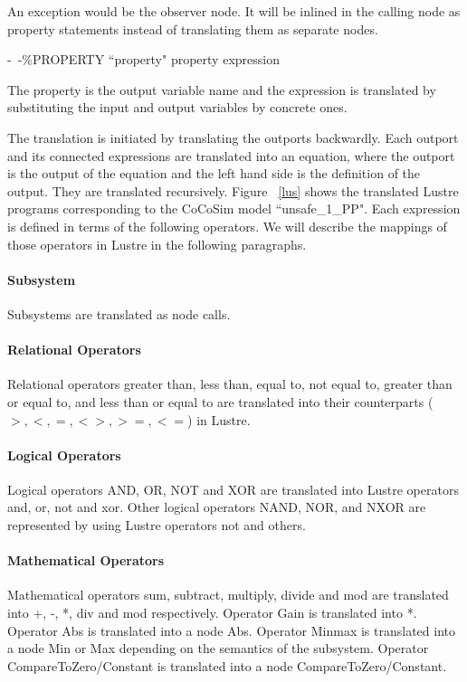 \documentclass{article}
\begin{document}
An exception would be the observer node.
It will be inlined in the calling node as property statements instead of translating them 
as separate nodes.

\*

\indent \indent \indent \indent \textsf{-\ -\%PROPERTY ``property" property expression}

\*


\noindent The \textsf{property} is the output variable name and the expression is translated 
by substituting the input and output variables by concrete ones.

The translation is initiated by translating the outports backwardly. 
Each outport and its connected expressions are translated into an equation, where the outport is the output of the equation 
and the left hand side is the definition of the output.
They are translated recursively.
Figure ~\ref{lus} shows the translated Lustre programs corresponding to the CoCoSim model ``unsafe\_1\_PP".
Each expression is defined in terms of the following operators. 
We will describe the mappings of those operators in Lustre in the following paragraphs.

\paragraph{Subsystem} 
Subsystems are translated as node calls. 


\paragraph{Relational Operators} 
Relational operators greater than, less than, equal to, not equal to, greater 
than or equal to, and less than or equal to are translated into their counterparts 
($>, <, =, <>, >=, <=$) in Lustre.


\paragraph{Logical Operators} 
Logical operators AND, OR, NOT and XOR are translated into Lustre operators 
\textsf{and, or, not} and \textsf{xor}.
Other logical operators NAND, NOR, and NXOR are represented by using Lustre 
operators \textsf{not} and others.

\paragraph{Mathematical Operators} 
Mathematical operators sum, subtract, multiply, divide and mod are translated into 
\textsf{+}, \textsf{-}, \textsf{*}, \textsf{div} and \textsf{mod} respectively.
Operator Gain is translated into \textsf{*}. 
Operator Abs is translated into a node Abs. 
Operator Minmax is translated into a node Min or Max depending on the semantics of the subsystem. 
Operator CompareToZero/Constant is translated into a node CompareToZero/Constant.
\end{document}
